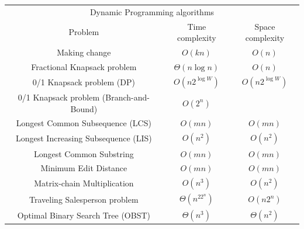 \begin{table}[H]
    \centering
    \begin{tabular}{|c|c|c|}
        \hline
        \multicolumn{3}{|c|}{Dynamic Programming algorithms} \\
        \Xhline{3\arrayrulewidth}
        Problem & Time complexity & Space complexity \\
        \Xhline{2\arrayrulewidth}
        Making change & $O(kn)$ & $O(n)$ \\
        \hline
        Fractional Knapsack problem & $\Theta(n\log n)$ & $O(n)$ \\
        \hline
        0/1 Knapsack problem (DP) & $O(n2^{\log W})$ & $O(n2^{\log W})$ \\
        \hline
        0/1 Knapsack problem (Branch-and-Bound) & $O(2^n)$ & \\
        \hline
        Longest Common Subsequence (LCS) & $O(mn)$ & $O(mn)$ \\
        \hline
        Longest Increasing Subsequence (LIS) & $O(n^2)$ & $O(n^2)$ \\
        \hline
        Longest Common Substring & $O(mn)$ & $O(mn)$ \\
        \hline
        Minimum Edit Distance & $O(mn)$ & $O(mn)$ \\
        \hline
        Matrix-chain Multiplication & $O(n^3)$ & $O(n^2)$ \\
        \hline
        Traveling Salesperson problem & $\Theta(n^22^n)$ & $O(n2^n)$ \\
        \hline
        Optimal Binary Search Tree (OBST) & $\Theta(n^3)$ & $\Theta(n^2)$ \\
        \hline
    \end{tabular}
\end{table}

